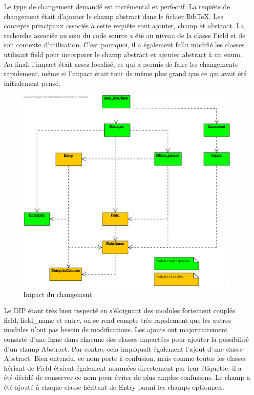 \documentclass[12pt,titlepage]{article}
\begin{document}
Le type de changement demandé est incrémental et perfectif. La requête de changement était d'ajouter le champ abstract dans le fichier BibTeX. Les concepts principaux associés à cette requête sont ajouter, champ et abstract. La recherche associée au sein du code source a été au niveau de la classe Field et de son contexte d'utilisation. C'est pourquoi, il a également fallu modifié les classes utilisant field pour incorporer le champ abstract et ajouter abstract à un enum. Au final, l'impact était assez localisé, ce qui a permis de faire les changements rapidement, même si l'impact était tout de même plus grand que ce qui avait été initialement pensé. \newline
\begin{figure}[h]
\caption{Impact du changement}
\includegraphics[width=\textwidth,height=.8\textheight,keepaspectratio]{impact.png}
\end{figure}

Le DIP étant très bien respecté en s'éloignant des modules fortement couplés field, field\_name et entry, on se rend compte très rapidement que les autres modules n'ont pas besoin de modifications. Les ajouts ont majoritairement consisté d'une ligne dans chacune des classes impactées pour ajouter la possibilité d'un champ Abstract. Par contre, cela impliquait également l'ajout d'une classe Abstract. Bien entendu, ce nom porte à confusion, mais comme toutes les classes hériant de Field étaient également nommées directement par leur étiquette, il a été décidé de conserver ce nom pour éviter de plus amples confusions. Le champ a été ajouté à chaque classe héritant de Entry parmi les champs optionnels. \newline
\end{document}
